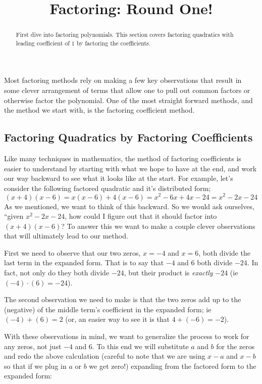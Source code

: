 \documentclass{ximera}
\title{Factoring: Round One!}
\begin{document}
\begin{abstract}
    First dive into factoring polynomials. This section covers factoring quadratics with leading coefficient of $1$ by factoring the coefficients.
\end{abstract}
\maketitle

Most factoring methods rely on making a few key observations that result in some clever arrangement of terms that allow one to pull out common factors or otherwise factor the polynomial. One of the most straight forward methods, and the method we start with, is the factoring coefficient method.


\subsection{Factoring Quadratics by Factoring Coefficients}
    Like many techniques in mathematics, the method of factoring coefficients is easier to understand by starting with what we hope to have at the end, and work our way backward to see what it looks like at the start. For example, let's consider the following factored quadratic and it's distributed form;
    \[
        (x + 4)(x - 6) = x(x - 6) + 4(x - 6) = x^2 -6x + 4x - 24 = x^2 - 2x - 24
    \]
    As we mentioned, we want to think of this backward. So we would ask ourselves, ``given $x^2 - 2x - 24$, how could I figure out that it should factor into $(x + 4)(x - 6)$? To answer this we want to make a couple clever observations that will ultimately lead to our method.
    
    First we need to observe that our two zeros, $x = -4$ and $x = 6$, both divide the last term in the expanded form. That is to say that $-4$ and $6$ both divide $-24$. In fact, not only do they both divide $-24$, but their product is \textit{exactly} $-24$ (ie $(-4) \cdot (6) = -24$). 

    The second observation we need to make is that the two zeros add up to the (negative) of the middle term's coefficient in the expanded form; ie $(-4) + (6) = 2$ (or, an easier way to see it is that $4 + (-6) = -2$).
    
    With these observations in mind, we want to generalize the process to work for any zeros, not just $-4$ and $6$. To this end we will substitute $a$ and $b$ for the zeros and redo the above calculation (careful to note that we are using $x-a$ and $x-b$ so that if we plug in $a$ or $b$ we get zero!) expanding from the factored form to the expanded form:
    
\end{document}

